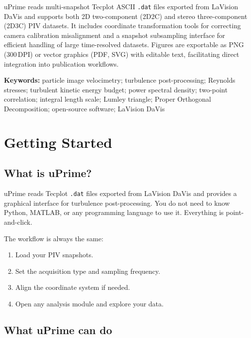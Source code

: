 \documentclass[11pt, a4paper]{report}
\newcommand{\software}[1]{\textsf{#1}}
\begin{document}
\software{uPrime} reads multi-snapshot Tecplot ASCII \texttt{.dat} files exported from LaVision DaVis and supports both 2D two-component (2D2C) and stereo three-component (2D3C) PIV datasets. It includes coordinate transformation tools for correcting camera calibration misalignment and a snapshot subsampling interface for efficient handling of large time-resolved datasets. Figures are exportable as PNG (300\,DPI) or vector graphics (PDF, SVG) with editable text, facilitating direct integration into publication workflows.

\vspace{0.5cm}
\noindent\textbf{Keywords:} particle image velocimetry; turbulence post-processing; Reynolds stresses; turbulent kinetic energy budget; power spectral density; two-point correlation; integral length scale; Lumley triangle; Proper Orthogonal Decomposition; open-source software; LaVision DaVis

\tableofcontents
\clearpage

\chapter{Getting Started}

\section{What is uPrime?}

\software{uPrime} reads Tecplot \texttt{.dat} files exported from LaVision DaVis and provides a graphical interface for turbulence post-processing. You do not need to know Python, MATLAB, or any programming language to use it. Everything is point-and-click.

The workflow is always the same:
\begin{enumerate}[leftmargin=1.5em]
  \item Load your PIV snapshots.
  \item Set the acquisition type and sampling frequency.
  \item Align the coordinate system if needed.
  \item Open any analysis module and explore your data.
\end{enumerate}

\section{What uPrime can do}
\end{document}
